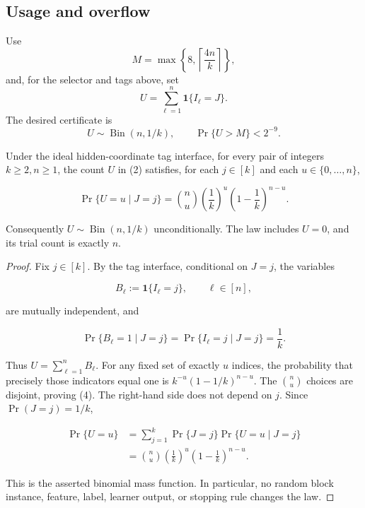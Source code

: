 \subsection{Usage and overflow}\label{app:step-009}
Use
\begin{equation}
M=\max\left\{8,\left\lceil\frac{4n}{k}\right\rceil\right\},
\tag{1}\label{eq:overflow-budget}
\end{equation}
and, for the selector and tags above, set
\begin{equation}
U=\sum_{\ell=1}^n\mathbf 1\{I_\ell=J\}.
\tag{2}\label{eq:usage-count}
\end{equation}
The desired certificate is
\begin{equation}
U\sim\operatorname{Bin}(n,1/k),
\qquad \Pr\{U>M\}<2^{-9}.
\tag{3}\label{eq:overflow-certificate}
\end{equation}
\begin{lemma}\label{lem:step-009-usage-law}
Under the ideal hidden-coordinate tag interface, for every pair of
integers \(k\ge2,n\ge1\), the count \(U\) in (2) satisfies, for each
\(j\in[k]\) and each \(u\in\{0,\ldots,n\}\),

\[
\Pr\{U=u\mid J=j\}
=\binom nu\left(\frac1k\right)^u
 \left(1-\frac1k\right)^{n-u}.
\tag{4}
\]

Consequently \(U\sim\operatorname{Bin}(n,1/k)\) unconditionally. The law
includes \(U=0\), and its trial count is exactly \(n\).
\end{lemma}

\begin{proof}
Fix \(j\in[k]\). By the tag interface, conditional on \(J=j\),
the variables

\[
B_\ell:=\mathbf1\{I_\ell=j\},\qquad \ell\in[n],
\]

are mutually independent, and

\[
\Pr\{B_\ell=1\mid J=j\}=\Pr\{I_\ell=j\mid J=j\}=\frac1k.
\]

Thus \(U=\sum_{\ell=1}^nB_\ell\). For any fixed set of exactly \(u\)
indices, the probability that precisely those indicators equal one is
\(k^{-u}(1-1/k)^{n-u}\). The \(\binom nu\) choices are disjoint, proving
(4). The right-hand side does not depend on \(j\). Since
\(\Pr(J=j)=1/k\),

\[
\begin{aligned}
\Pr\{U=u\}
&=\sum_{j=1}^k\Pr\{J=j\}\Pr\{U=u\mid J=j\}\\
&=\binom nu\left(\frac1k\right)^u
 \left(1-\frac1k\right)^{n-u}.
\end{aligned}
\]

This is the asserted binomial mass function. In particular, no random block
instance, feature, label, learner output, or stopping rule changes the law.
\end{proof}

